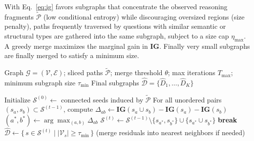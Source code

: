 \documentclass[sigconf]{acmart}
\begin{document}


With Eq.~\eqref{eq:ig} favors subgraphs that concentrate the observed
reasoning fragments \(\tilde{\mathcal{P}}\) (low conditional entropy) while discouraging oversized regions (size penalty), paths frequently traversed by questions with similar semantic or structural types
are gathered into the same subgraph, subject to a size cap \(\eta_{\max}\). A greedy merge maximizes the marginal gain in \(\mathbf{IG}\). Finally very small subgraphs are finally merged to satisfy a minimum size.

\begin{algorithm}[H]
\caption{KG Partitioning via Greedy Information-Gain Merging}
\label{alg:alg_gp}
\begin{algorithmic}[1]
\Require Graph \(\mathcal{G}=(\mathcal{V},\mathcal{E})\); sliced paths \(\tilde{\mathcal{P}}\);
         merge threshold \(\theta\); max iterations \(T_{\max}\);
         minimum subgraph size \(\tau_{\min}\)
\Ensure Final subgraphs \(\hat{\mathcal{D}}=\{\hat{D}_1,\ldots,\hat{D}_K\}\)

\State Initialize \(\mathcal{S}^{(0)} \leftarrow\) connected seeds induced by \(\tilde{\mathcal{P}}\)
    \State For all unordered pairs \((s_a,s_b) \subset \mathcal{S}^{(t-1)}\), compute
           \(\Delta_{ab} \leftarrow \mathbf{IG}(s_a \cup s_b) - \mathbf{IG}(s_a) - \mathbf{IG}(s_b)\)
    \State \((a^*,b^*) \leftarrow \arg\max_{(a,b)} \Delta_{ab}\)
        \State \(\mathcal{S}^{(t)} \leftarrow \mathcal{S}^{(t-1)} \setminus \{s_{a^*}, s_{b^*}\} \cup \{s_{a^*}\!\cup\! s_{b^*}\}\)
    \Else
        \State \textbf{break}
    \EndIf
\EndFor
\State \(\hat{\mathcal{D}} \leftarrow \{\, s \in \mathcal{S}^{(t)} \mid \lvert \mathcal{V}_{s} \rvert \ge \tau_{\min} \,\}\) \; (merge residuals into nearest neighbors if needed)
\end{algorithmic}
\end{algorithm}
\end{document}
